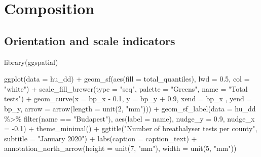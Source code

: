 \documentclass[
]{book}
\newenvironment{Shaded}{\begin{snugshade}}{\end{snugshade}}
\newcommand{\AttributeTok}[1]{\textcolor[rgb]{0.77,0.63,0.00}{#1}}
\newcommand{\DecValTok}[1]{\textcolor[rgb]{0.00,0.00,0.81}{#1}}
\newcommand{\FloatTok}[1]{\textcolor[rgb]{0.00,0.00,0.81}{#1}}
\newcommand{\FunctionTok}[1]{\textcolor[rgb]{0.00,0.00,0.00}{#1}}
\newcommand{\NormalTok}[1]{#1}
\newcommand{\SpecialCharTok}[1]{\textcolor[rgb]{0.00,0.00,0.00}{#1}}
\newcommand{\StringTok}[1]{\textcolor[rgb]{0.31,0.60,0.02}{#1}}
\begin{document}
\hypertarget{composition}{%
\section{Composition}\label{composition}}

\hypertarget{orientation-and-scale-indicators}{%
\subsection{Orientation and scale indicators}\label{orientation-and-scale-indicators}}

\begin{Shaded}
\begin{Highlighting}[]
\FunctionTok{library}\NormalTok{(ggspatial)}

\FunctionTok{ggplot}\NormalTok{(}\AttributeTok{data =}\NormalTok{ hu\_dd) }\SpecialCharTok{+} 
  \FunctionTok{geom\_sf}\NormalTok{(}\FunctionTok{aes}\NormalTok{(}\AttributeTok{fill =}\NormalTok{ total\_quantiles), }\AttributeTok{lwd =} \FloatTok{0.5}\NormalTok{, }\AttributeTok{col =} \StringTok{"white"}\NormalTok{) }\SpecialCharTok{+} 
  \FunctionTok{scale\_fill\_brewer}\NormalTok{(}\AttributeTok{type =} \StringTok{"seq"}\NormalTok{, }\AttributeTok{palette =} \StringTok{"Greens"}\NormalTok{, }\AttributeTok{name =} \StringTok{"Total tests"}\NormalTok{) }\SpecialCharTok{+} 
  \FunctionTok{geom\_curve}\NormalTok{(}\AttributeTok{x =}\NormalTok{ bp\_x }\SpecialCharTok{{-}} \FloatTok{0.1}\NormalTok{, }
             \AttributeTok{y =}\NormalTok{ bp\_y }\SpecialCharTok{+} \FloatTok{0.9}\NormalTok{, }
             \AttributeTok{xend =}\NormalTok{ bp\_x , }
             \AttributeTok{yend =}\NormalTok{ bp\_y, }
             \AttributeTok{arrow =} \FunctionTok{arrow}\NormalTok{(}\AttributeTok{length =} \FunctionTok{unit}\NormalTok{(}\DecValTok{2}\NormalTok{, }\StringTok{"mm"}\NormalTok{))) }\SpecialCharTok{+}
  \FunctionTok{geom\_sf\_label}\NormalTok{(}\AttributeTok{data =}\NormalTok{ hu\_dd }\SpecialCharTok{\%\textgreater{}\%} \FunctionTok{filter}\NormalTok{(name }\SpecialCharTok{==} \StringTok{"Budapest"}\NormalTok{), }
                \FunctionTok{aes}\NormalTok{(}\AttributeTok{label =}\NormalTok{ name), }
                \AttributeTok{nudge\_y =} \FloatTok{0.9}\NormalTok{, }
                \AttributeTok{nudge\_x =} \SpecialCharTok{{-}}\FloatTok{0.1}\NormalTok{) }\SpecialCharTok{+} 
  \FunctionTok{theme\_minimal}\NormalTok{() }\SpecialCharTok{+} 
  \FunctionTok{ggtitle}\NormalTok{(}\StringTok{"Number of breathalyser tests per county"}\NormalTok{, }\AttributeTok{subtitle =} \StringTok{"January 2020"}\NormalTok{) }\SpecialCharTok{+} 
  \FunctionTok{labs}\NormalTok{(}\AttributeTok{caption =}\NormalTok{ caption\_text) }\SpecialCharTok{+} 
  \FunctionTok{annotation\_north\_arrow}\NormalTok{(}\AttributeTok{height =} \FunctionTok{unit}\NormalTok{(}\DecValTok{7}\NormalTok{, }\StringTok{"mm"}\NormalTok{), }\AttributeTok{width =} \FunctionTok{unit}\NormalTok{(}\DecValTok{5}\NormalTok{, }\StringTok{"mm"}\NormalTok{)) }
\end{Highlighting}
\end{Shaded}
\end{document}
